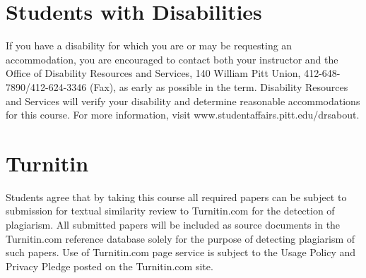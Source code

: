 \documentclass[
]{book}
\begin{document}
\hypertarget{students-with-disabilities}{%
\chapter{Students with Disabilities}\label{students-with-disabilities}}

If you have a disability for which you are or may be requesting an accommodation, you are encouraged to contact both your instructor and the Office of Disability Resources and Services, 140 William Pitt Union, 412-648-7890/412-624-3346 (Fax), as early as possible in the term. Disability Resources and Services will verify your disability and determine reasonable accommodations for this course. For more information, visit www.studentaffairs.pitt.edu/drsabout.

\hypertarget{turnitin}{%
\chapter{Turnitin}\label{turnitin}}

Students agree that by taking this course all required papers can be subject to submission for textual similarity review to Turnitin.com for the detection of plagiarism. All submitted papers will be included as source documents in the Turnitin.com reference database solely for the purpose of detecting plagiarism of such papers. Use of Turnitin.com page service is subject to the Usage Policy and Privacy Pledge posted on the Turnitin.com site.
\end{document}
